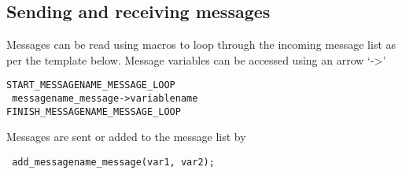 \subsection{Sending and receiving messages}

Messages can be read using macros to loop through the incoming message list as per the template below.
Message variables can be accessed using an arrow `->'

\begin{mylisting}
\begin{verbatim}
START_MESSAGENAME_MESSAGE_LOOP
 messagename_message->variablename
FINISH_MESSAGENAME_MESSAGE_LOOP
\end{verbatim}
\end{mylisting}

Messages are sent or added to the message list by
\begin{mylisting}
\begin{verbatim}
 add_messagename_message(var1, var2);
\end{verbatim}
\end{mylisting}
